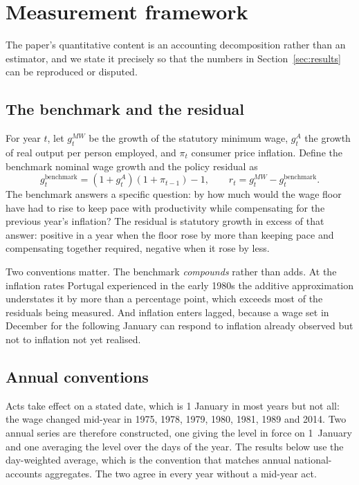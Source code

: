 \section{Measurement framework}
\label{sec:methods}

The paper's quantitative content is an accounting decomposition rather than an
estimator, and we state it precisely so that the numbers in
Section~\ref{sec:results} can be reproduced or disputed.

\subsection{The benchmark and the residual}

For year $t$, let $g^{MW}_t$ be the growth of the statutory minimum wage,
$g^{A}_t$ the growth of real output per person employed, and $\pi_t$ consumer
price inflation. Define the benchmark nominal wage growth and the policy
residual as
%
\begin{equation}
  g^{\text{benchmark}}_{t} = (1 + g^{A}_{t})(1 + \pi_{t-1}) - 1,
  \qquad
  r_{t} = g^{MW}_{t} - g^{\text{benchmark}}_{t}.
  \label{eq:residual}
\end{equation}
%
The benchmark answers a specific question: by how much would the wage floor have
had to rise to keep pace with productivity while compensating for the previous
year's inflation? The residual is statutory growth in excess of that answer:
positive in a year when the floor rose by more than keeping pace and
compensating together required, negative when it rose by less.

Two conventions matter. The benchmark \emph{compounds} rather than adds. At the
inflation rates Portugal experienced in the early 1980s the additive
approximation understates it by more than a percentage point, which exceeds most
of the residuals being measured. And inflation enters lagged, because a wage set
in December for the following January can respond to inflation already observed
but not to inflation not yet realised.

\subsection{Annual conventions}

Acts take effect on a stated date, which is 1 January in most years but not all:
the wage changed mid-year in 1975, 1978, 1979, 1980, 1981, 1989 and 2014. Two
annual series are therefore constructed, one giving the level in force on
1~January and one averaging the level over the days of the year. The results
below use the day-weighted average, which is the convention that matches annual
national-accounts aggregates. The two agree in every year without a mid-year
act.

